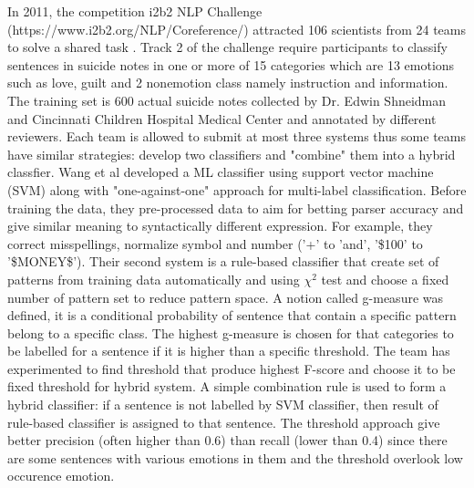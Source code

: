 In 2011, the competition i2b2 NLP Challenge (https://www.i2b2.org/NLP/Coreference/) attracted 106 scientists from 24 teams to solve a shared task \cite{Pestian2012}. Track 2 of the challenge require participants to classify sentences in suicide notes in one or more of 15 categories which are 13 emotions such as love, guilt and 2 nonemotion class namely instruction and information. The training set is 600 actual suicide notes collected by Dr. Edwin Shneidman and Cincinnati Children Hospital Medical Center and annotated by different reviewers. Each team is allowed to submit at most three systems thus some teams have similar strategies: develop two classifiers and "combine" them into a hybrid classfier. Wang et al \cite{Wang2012} developed a ML classifier using support vector machine (SVM) along with "one-against-one" approach for multi-label classification. Before training the data, they pre-processed data to aim for betting parser accuracy and give similar meaning to syntactically different expression. For example, they correct misspellings, normalize symbol and number (’+’ to ’and’, ’\$100’ to ’\$MONEY\$’). Their second system is a rule-based classifier that create set of patterns from training data automatically and using $\chi^2$ test and choose a fixed number of pattern set to reduce pattern space. A notion called g-measure was defined, it is a conditional probability of sentence that contain a specific pattern belong to a specific class. The highest g-measure is chosen for that categories to be labelled for a sentence if it is higher than a specific threshold. The team has experimented to find threshold that produce highest F-score and choose it to be fixed threshold for hybrid system. A simple combination rule is used to form a hybrid classifier: if a sentence is not labelled by SVM classifier, then result of rule-based classifier is assigned to that sentence. The threshold approach give better precision (often higher than 0.6) than recall (lower than 0.4) since there are some sentences with various emotions in them and the threshold overlook low occurence emotion.\\

